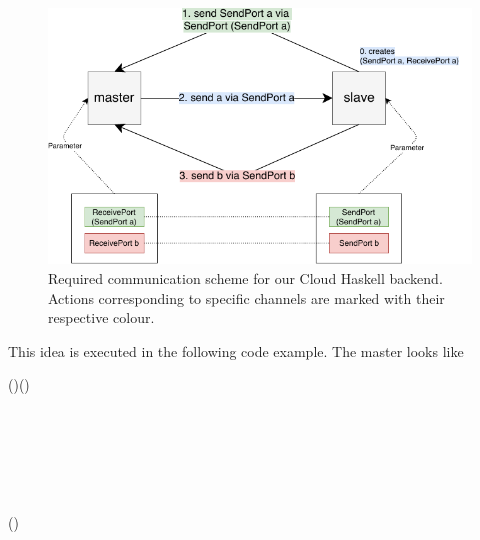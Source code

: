 \documentclass[paper=A4,twoside=true,openright,parskip=full,chapterprefix=true,headings=normal,bibliography=totoc,listof=totoc,titlepage=on,captions=tableabove,draft=false,british]{scrreprt}%
\begin{document}
\begin{figure}
\centering
\includegraphics{src/img/CloudHaskellCommunication.pdf}
\caption[Required communication scheme for our Cloud Haskell backend.]{Required communication scheme for our Cloud Haskell backend.
Actions corresponding to specific channels are marked with their
respective colour.\label{fig:cloudHaskellGeneralComm}}
\end{figure}

This idea is executed in the following code example. The master looks
like


\begin{hscode}\SaveRestoreHook
{}%
%
%
\>[B]{}\mathbin{::}\;(\;)\to {}\;\to {}\;(){}\<[E]%
\\
\>[B]{}\;\;\mathrel{=}\<[E]%
\\
\>[B]{}\<[5]%
\>[5]{}\leftarrow {}\;\<[E]%
\\[\blanklineskip]%
\>[B]{}\<[5]%
\>[5]{}\;\mathrel{=}\<[E]%
\\
\>[B]{}\<[5]%
\>[5]{}\;\;\<[E]%
\\[\blanklineskip]%
\>[B]{}\<[5]%
\>[5]{}\leftarrow {}\;\<[E]%
\\
\>[B]{}\<[5]%
\>[5]{}\<[E]%
\\[\blanklineskip]%
\>[B]{}\<[5]%
\>[5]{}\;(){}\<[E]%
\ColumnHook
\end{hscode}\resethooks
\vspace{-2\baselineskip}
\end{document}
